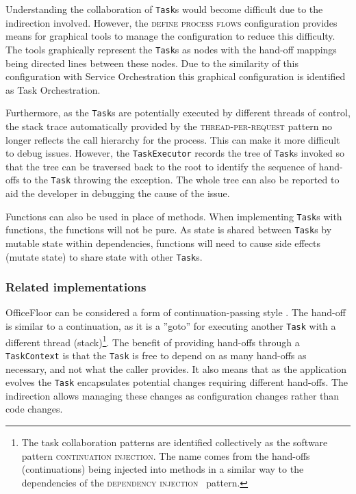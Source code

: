 \documentclass[prodmode]{style/acmlarge}
\begin{document}
Understanding the collaboration of \texttt{Task}s would become difficult due to
the indirection involved.  However, the \textsc{define process flows}
configuration provides means for graphical tools to manage the configuration to
reduce this difficulty.  The tools graphically represent the \texttt{Task}s as
nodes with the hand-off mappings being directed lines between these nodes.  Due
to the similarity of this configuration with Service Orchestration this
graphical configuration is identified as Task Orchestration.

Furthermore, as the \texttt{Task}s are potentially executed by different threads
of control, the stack trace automatically provided by the
\textsc{thread-per-request} pattern no longer reflects the call hierarchy for
the process.  This can make it more difficult to debug issues.  However, the
\texttt{TaskExecutor} records the tree of \texttt{Task}s invoked so that the
tree can be traversed back to the root to identify the sequence of hand-offs to
the \texttt{Task} throwing the exception.  The whole tree can also be reported
to aid the developer in debugging the cause of the issue.

Functions can also be used in place of methods.  When implementing
\texttt{Task}s with functions, the functions will not be pure.  As state is
shared between \texttt{Task}s by mutable state within dependencies, functions
will need to cause side effects (mutate state) to share state with other
\texttt{Task}s.



\subsubsection*{Related implementations}

OfficeFloor can be considered a form of continuation-passing style
\cite{continuations}.  The hand-off is similar to a continuation, as it is a
''goto'' for executing another \texttt{Task} with a different thread
(stack)\footnote{The task collaboration patterns are identified collectively as
the software pattern \textsc{continuation injection}.  The name comes from the
hand-offs (continuations) being injected into methods in a similar way to the
dependencies of the \textsc{dependency injection}~\cite{ioc} pattern.}.  The
benefit of providing hand-offs through a \texttt{TaskContext} is that the
\texttt{Task} is free to depend on as many hand-offs as necessary, and not what
the caller provides.  It also means that as the application evolves the
\texttt{Task} encapsulates potential changes requiring different hand-offs.  The
indirection allows managing these changes as configuration changes rather than
code changes.
\end{document}

